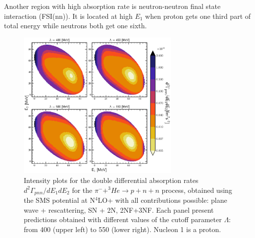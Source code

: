     Another region with high absorption rate is neutron-neutron final state interaction (FSI(nn)).
    It is located at high $E_1$ when proton gets one third part of total energy while neutrons both get
    one sixth.
    
        \begin{figure}[h]
            \begin{center}
            \includegraphics[width=0.7\textwidth]{PlotData/PION/Dalitz_maps/figures/Dalitz_map_pnn_E1E2_cutofs.pdf}
            \end{center}
            \caption{Intensity plots for the double differential absorption rates
            $d^2 \Gamma_{pnn}/dE_1dE_2$ for the $\pi^- + ^3He \rightarrow p + n + n$
            process, obtained using the SMS potential at N$^4$LO+
            with all contributions possible: plane wave + rescattering, SN + 2N, 2NF+3NF.
            Each panel present predictions obtained with different values of the cutoff parameter $\Lambda$:
            from \SI{400}{\mev} (upper left) to \SI{550}{\mev} (lower right). Nucleon 1 is a proton.}
            \label{pion_map_E1E2_cutoff}
        \end{figure}

